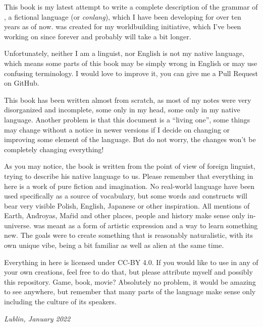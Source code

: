 This book is my latest attempt to write a complete description of the grammar of
\andro, a fictional language (or \emph{conlang}), which I have been developing
for over ten years as of now. \andro was created for my worldbuilding
initiative, which I've been working on since forever and probably will take a
bit longer.

Unfortunately, neither I am a linguist, nor English is not my native language,
which means some parts of this book may be simply wrong in English or may use
confusing terminology. I would love to improve it, you can give me a Pull
Request on GitHub.

This book has been written almost from scratch, as most of my notes were very
disorganized and incomplete, some only in my head, some only in my native
language. Another problem is that this document is a ``living one'', some things
may change without a notice in newer versions if I decide on changing or
improving some element of the language. But do not worry, the changes won't be
completely changing everything!

As you may notice, the book is written from the point of view of foreign
linguist, trying to describe his native language to us. Please remember that
everything in here is a work of pure fiction and imagination. No real-world
language have been used specifically as a source of vocabulary, but some words
and constructs will bear very visible Polish, English, Japanese or other
inspiration. All mentions of Earth, And́royas, Maŕid and other places, people
and history make sense only in-universe. \andro was meant as a form of artistic
expression and a way to learn something new. The goals were to create something
that is reasonably naturalistic, with its own unique vibe, being a bit familiar
as well as alien at the same time.

Everything in here is licensed under \textsc{CC-BY 4.0}. If you would like to
use \andro in any of your own creations, feel free to do that, but please
attribute myself and possibly this repository. Game, book, movie? Absolutely no
problem, it would be amazing to see \andro anywhere, but remember that many
parts of the language make sense only including the culture of its speakers.

\begin{flushright}\itshape\footnotesize
    Lublin, January 2022
\end{flushright}